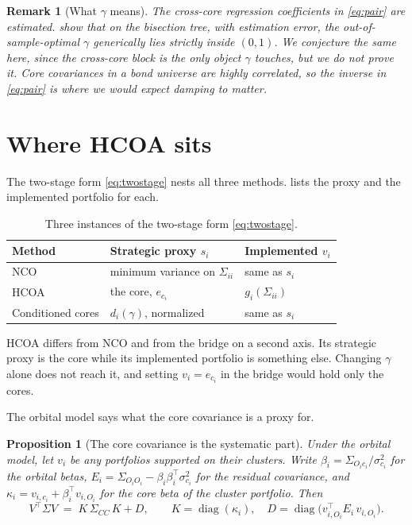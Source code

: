 \documentclass[11pt]{article}
\DeclareMathOperator{\diag}{diag}
\newtheorem{proposition}{Proposition}
\newtheorem{remark}{Remark}
\begin{document}
\begin{remark}[What $\gamma$ means]
The cross-core regression coefficients in \eqref{eq:pair} are estimated.
\textcite{cotton2026bridge} show that on the bisection tree, with
estimation error, the out-of-sample-optimal $\gamma$ generically lies
strictly inside $(0,1)$. We conjecture the same here, since the cross-core
block is the only object $\gamma$ touches, but we do not prove it. Core
covariances in a bond universe are highly correlated, so the inverse in
\eqref{eq:pair} is where we would expect damping to matter.
\end{remark}

\section{Where HCOA sits}
\label{sec:hcoa}

The two-stage form \eqref{eq:twostage} nests all three methods.
 lists the proxy and the implemented portfolio for each.

\begin{table}[ht]
\centering
\begin{tabular}{@{}lll@{}}
\toprule
Method & Strategic proxy $s_i$ & Implemented $v_i$ \\
\midrule
NCO & minimum variance on $\Sigma_{ii}$ & same as $s_i$ \\
HCOA & the core, $e_{c_i}$ & $g_i(\Sigma_{ii})$ \\
Conditioned cores & $d_i(\gamma)$, normalized & same as $s_i$ \\
\bottomrule
\end{tabular}
\caption{Three instances of the two-stage form \eqref{eq:twostage}.}
\label{tab:nest}
\end{table}

HCOA differs from NCO and from the bridge on a second axis. Its strategic
proxy is the core while its implemented portfolio is something else.
Changing $\gamma$ alone does not reach it, and setting $v_i=e_{c_i}$ in the
bridge would hold only the cores.

The orbital model says what the core covariance is a proxy for.

\begin{proposition}[The core covariance is the systematic part]
\label{prop:proxy}
Under the orbital model, let $v_i$ be any portfolios supported on their
clusters. Write $\beta_i=\Sigma_{O_ic_i}/\sigma_{c_i}^2$ for the orbital
betas, $E_i=\Sigma_{O_iO_i}-\beta_i\beta_i^\top\sigma_{c_i}^2$ for the
residual covariance, and $\kappa_i=v_{i,c_i}+\beta_i^\top v_{i,O_i}$ for
the core beta of the cluster portfolio. Then
\begin{equation}
  V^\top\Sigma V \;=\; K\,\Sigma_{CC}\,K + D,
  \qquad K=\diag(\kappa_i),
  \quad D=\diag\!\big(v_{i,O_i}^\top E_i\,v_{i,O_i}\big).
  \label{eq:proxy}
\end{equation}
\end{proposition}
\end{document}
